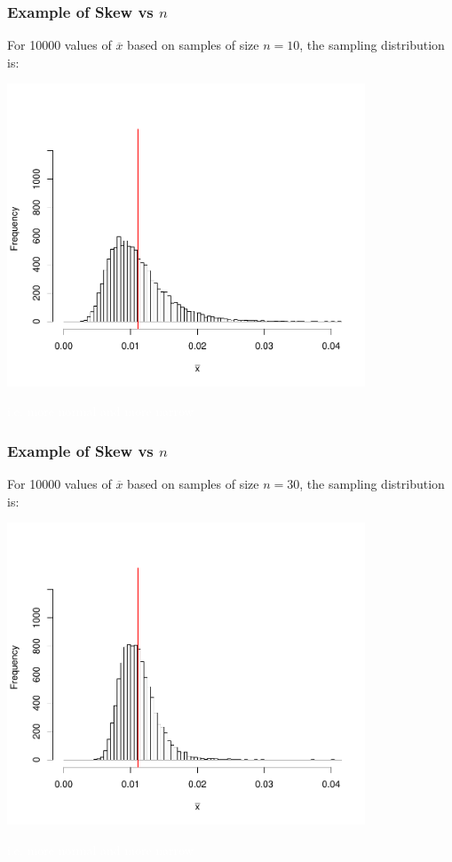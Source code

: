 \documentclass[slides]{beamer}
\newcommand{\blue}[1]{\textcolor{blue2}{#1}}
\newcommand{\white}[1]{\textcolor{white}{#1}}
\newcommand{\xbar}{\overline{x}}
\begin{document}
\begin{frame}
\frametitle{Example of Skew vs $n$}
For 10000 values of $\xbar$ based on samples of size \blue{$n=10$}, the sampling distribution is:
\begin{center}
\includegraphics[width=0.8\textwidth]{figure/hist10.pdf}
\end{center}
\white{i.e. more normal and more narrow}
\end{frame}


\begin{frame}
\frametitle{Example of Skew vs $n$}
For 10000 values of $\xbar$ based on samples of size \blue{$n=30$}, the sampling distribution is:
\begin{center}
\includegraphics[width=0.8\textwidth]{figure/hist30.pdf}
\end{center}
\white{i.e. more normal and more narrow}
\end{frame}
\end{document}
